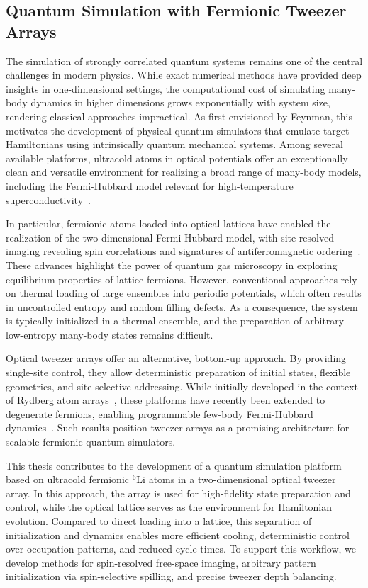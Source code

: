 \subsection{Quantum Simulation with Fermionic Tweezer Arrays}

The simulation of strongly correlated quantum systems remains one of the central challenges in modern physics. While exact numerical methods have provided deep insights in one-dimensional settings, the computational cost of simulating many-body dynamics in higher dimensions grows exponentially with system size, rendering classical approaches impractical. As first envisioned by Feynman, this motivates the development of physical quantum simulators that emulate target Hamiltonians using intrinsically quantum mechanical systems. Among several available platforms, ultracold atoms in optical potentials offer an exceptionally clean and versatile environment for realizing a broad range of many-body models, including the Fermi-Hubbard model relevant for high-temperature superconductivity~\cite{esslinger_fermi-hubbard_2010, gross_quantum_2017}.

In particular, fermionic atoms loaded into optical lattices have enabled the realization of the two-dimensional Fermi-Hubbard model, with site-resolved imaging revealing spin correlations and signatures of antiferromagnetic ordering~\cite{parsons_site-resolved_2016, boll_spin-_2016}. These advances highlight the power of quantum gas microscopy in exploring equilibrium properties of lattice fermions. However, conventional approaches rely on thermal loading of large ensembles into periodic potentials, which often results in uncontrolled entropy and random filling defects. As a consequence, the system is typically initialized in a thermal ensemble, and the preparation of arbitrary low-entropy many-body states remains difficult.

Optical tweezer arrays offer an alternative, bottom-up approach. By providing single-site control, they allow deterministic preparation of initial states, flexible geometries, and site-selective addressing. While initially developed in the context of Rydberg atom arrays~\cite{browaeys_many-body_2020}, these platforms have recently been extended to degenerate fermions, enabling programmable few-body Fermi-Hubbard dynamics~\cite{spar_realization_2022, yan_two-dimensional_2022}. Such results position tweezer arrays as a promising architecture for scalable fermionic quantum simulators.

This thesis contributes to the development of a quantum simulation platform based on ultracold fermionic $^6$Li atoms in a two-dimensional optical tweezer array. In this approach, the array is used for high-fidelity state preparation and control, while the optical lattice serves as the environment for Hamiltonian evolution. Compared to direct loading into a lattice, this separation of initialization and dynamics enables more efficient cooling, deterministic control over occupation patterns, and reduced cycle times. To support this workflow, we develop methods for spin-resolved free-space imaging, arbitrary pattern initialization via spin-selective spilling, and precise tweezer depth balancing.

